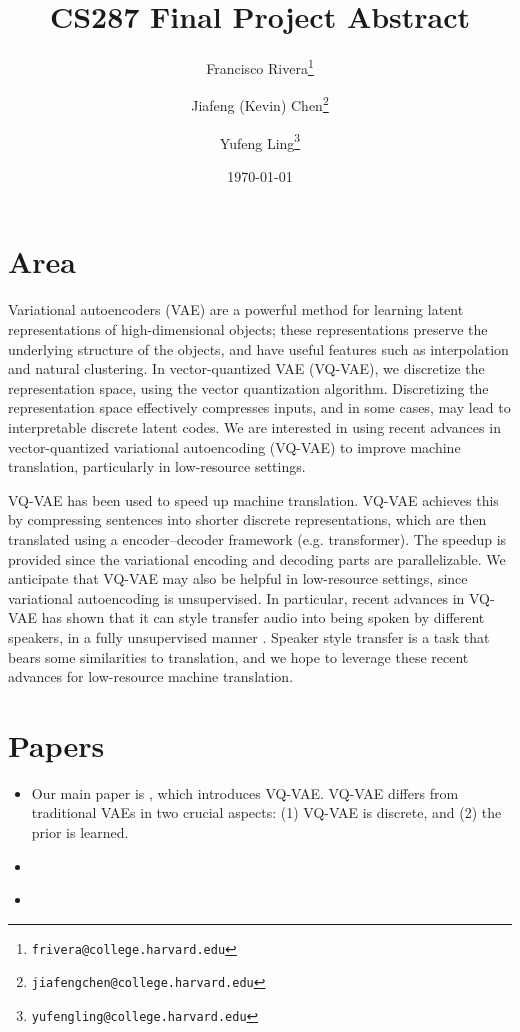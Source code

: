 \documentclass[11pt]{article}
\begin{document}
\title{CS287 Final Project Abstract}
\author{Francisco Rivera\thanks{\texttt{frivera@college.harvard.edu}} \and Jiafeng (Kevin) Chen\thanks{\texttt{jiafengchen@college.harvard.edu}} \and Yufeng Ling\thanks{\texttt{yufengling@college.harvard.edu}}}
\date{\today}

\maketitle

\section{Area}

Variational autoencoders (VAE) are a powerful method for learning latent
representations of high-dimensional objects; these representations preserve the
underlying structure of the objects, and have useful features such as
interpolation and natural clustering. In vector-quantized VAE (VQ-VAE), we
discretize the representation space, using the vector quantization algorithm.
Discretizing the representation space effectively compresses inputs, and in some
cases, may lead to interpretable discrete latent codes. We are interested in
using recent advances in vector-quantized variational autoencoding (VQ-VAE) to
improve machine translation, particularly in low-resource settings. 

VQ-VAE has
been used \citep{kaiser2018fast} to speed up machine translation. VQ-VAE
achieves this by compressing sentences into shorter discrete representations,
which are then translated using a encoder--decoder framework (e.g. transformer).
The speedup is provided since the variational encoding and decoding parts are
parallelizable. We anticipate that VQ-VAE may also be helpful in low-resource
settings, since variational autoencoding is unsupervised. In particular, recent
advances in VQ-VAE has shown that it can style transfer audio into being spoken
by different
speakers, in a fully unsupervised manner \citep{van2017neural}. Speaker style
transfer is a task that
bears some similarities to translation, and we hope to
leverage these recent advances for low-resource machine translation.

\section{Papers}
\begin{itemize}
    \item Our main paper is \cite*{van2017neural}, which introduces VQ-VAE.
    VQ-VAE differs from traditional VAEs in two crucial aspects: (1) VQ-VAE is
    discrete, and (2) the prior is learned. 
    \item \cite*{kaiser2018fast}  
    \item \cite{guzman2019two}
\end{itemize}
\end{document}
